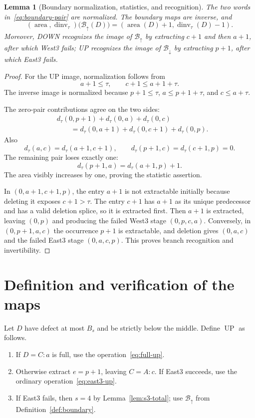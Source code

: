 \documentclass[11pt]{article}
\newtheorem{lemma}[theorem]{Lemma}
\theoremstyle{definition}
\theoremstyle{remark}
\newcommand{\area}{\operatorname{area}}
\newcommand{\dinv}{\operatorname{dinv}}
\newcommand{\UP}{\operatorname{UP}}
\begin{document}
\begin{lemma}[Boundary normalization, statistics, and recognition]
\label{lem:boundary-check}
The two words in~\eqref{eq:boundary-pair} are normalized.  The boundary
maps are inverse, and
\[
 (\area,\dinv_\tau)\bigl(\mathcal B_\uparrow(D)\bigr)
 =(\area(D)+1,\dinv_\tau(D)-1).
\]
Moreover, DOWN recognizes the image of $\mathcal B_\uparrow$ by extracting
$c+1$ and then $a+1$, after which West3 fails; UP recognizes the image of
$\mathcal B_\downarrow$ by extracting $p+1$, after which East3 fails.
\end{lemma}

\begin{proof}
For the UP image, normalization follows from
\[
 a+1\le\tau,\qquad c+1\le a+1+\tau.
\]
The inverse image is normalized because $p+1\le\tau$,
$a\le p+1+\tau$, and $c\le a+\tau$.

The zero-pair contributions agree on the two sides:
\begin{align*}
 &d_\tau(0,p+1)+d_\tau(0,a)+d_\tau(0,c)\\
 &\qquad =
 d_\tau(0,a+1)+d_\tau(0,c+1)+d_\tau(0,p).
\end{align*}
Also
\[
 d_\tau(a,c)=d_\tau(a+1,c+1),\qquad
 d_\tau(p+1,c)=d_\tau(c+1,p)=0.
\]
The remaining pair loses exactly one:
\[
 d_\tau(p+1,a)=d_\tau(a+1,p)+1.
\]
The area visibly increases by one, proving the statistic assertion.

In $(0,a+1,c+1,p)$, the entry $a+1$ is not extractable initially because
deleting it exposes $c+1>\tau$.  The entry $c+1$ has $a+1$ as its unique
predecessor and has a valid deletion splice, so it is extracted first.
Then $a+1$ is extracted, leaving $(0,p)$ and producing the failed West3
stage $(0,p,c,a)$.  Conversely, in $(0,p+1,a,c)$ the occurrence $p+1$ is
extractable, and deletion gives $(0,a,c)$ and the failed East3 stage
$(0,a,c,p)$.  This proves branch recognition and invertibility.
\end{proof}

\section{Definition and verification of the maps}

Let $D$ have defect at most $B_s$ and be strictly below the middle.  Define
$\UP$ as follows.
\begin{enumerate}
\item If $D=C:a$ is full, use the operation~\eqref{eq:full-up}.
\item Otherwise extract $e=p+1$, leaving $C=A:c$.  If East3 succeeds, use
the ordinary operation~\eqref{eq:east3-up}.
\item If East3 fails, then $s=4$ by Lemma~\ref{lem:s3-total}; use
$\mathcal B_\uparrow$ from Definition~\ref{def:boundary}.
\end{enumerate}
\end{document}
